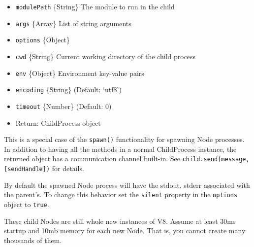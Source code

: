\begin{itemize}
\item
  \texttt{modulePath} \{String\} The module to run in the child
\item
  \texttt{args} \{Array\} List of string arguments
\item
  \texttt{options} \{Object\}
\item
  \texttt{cwd} \{String\} Current working directory of the child process
\item
  \texttt{env} \{Object\} Environment key-value pairs
\item
  \texttt{encoding} \{String\} (Default: `utf8')
\item
  \texttt{timeout} \{Number\} (Default: 0)
\item
  Return: ChildProcess object
\end{itemize}

This is a special case of the \texttt{spawn()} functionality for
spawning Node processes. In addition to having all the methods in a
normal ChildProcess instance, the returned object has a communication
channel built-in. See \texttt{child.send(message, {[}sendHandle{]})} for
details.

By default the spawned Node process will have the stdout, stderr
associated with the parent's. To change this behavior set the
\texttt{silent} property in the \texttt{options} object to
\texttt{true}.

These child Nodes are still whole new instances of V8. Assume at least
30ms startup and 10mb memory for each new Node. That is, you cannot
create many thousands of them.
